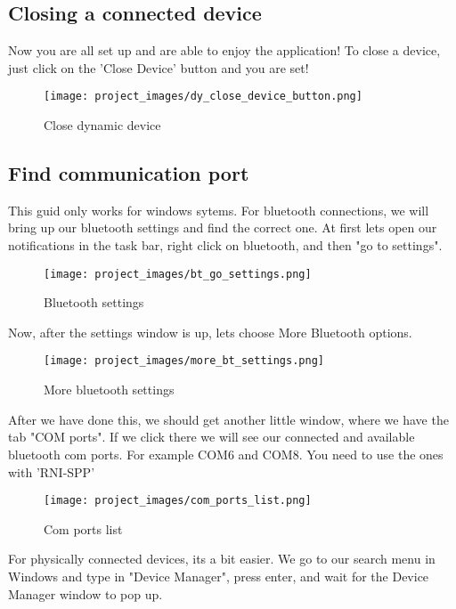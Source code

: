 	\subsection{Closing a connected device}
	Now you are all set up and are able to enjoy the application! To close a device, just click on the 'Close Device' button and you are set!

	\begin{figure}[H]
	\centering
	\texttt{[image: project\_images/dy\_close\_device\_button.png]}
	 \caption{Close dynamic device}
	 \label{fig:close dynamic device}
	\end{figure}

	\subsection{Find communication port}
	 This guid only works for windows sytems.
	 For bluetooth connections, we will bring up our bluetooth settings and find the correct one.
	 At first lets open our notifications in the task bar, right click on bluetooth, and then "go to settings".

	\begin{figure}[H]
	\centering
	\texttt{[image: project\_images/bt\_go\_settings.png]}
	 \caption{Bluetooth settings}
	 \label{fig:bt_settings}
	\end{figure}	

	Now, after the settings window is up, lets choose More Bluetooth options.

	\begin{figure}[H]
	\centering
	\texttt{[image: project\_images/more\_bt\_settings.png]}
	 \caption{More bluetooth settings}
	 \label{fig:more_bt_settings}
	\end{figure}

	After we have done this, we should get another little window, where we have the tab "COM ports". If we click there we will see our connected and available bluetooth com ports. For example COM6 and COM8. You need to use the ones with 'RNI-SPP'

	\begin{figure}[H]
	\centering
	\texttt{[image: project\_images/com\_ports\_list.png]}
	 \caption{Com ports list}
	 \label{fig:com_ports_list}
	\end{figure}

For physically connected devices, its a bit easier. We go to our search menu in Windows and type in "Device Manager", press enter, and wait for the Device Manager window to pop up.

